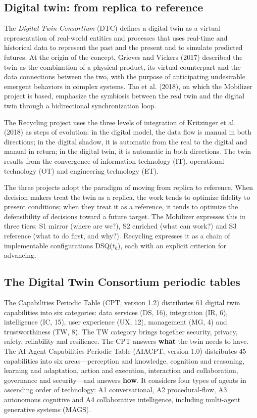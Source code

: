 \documentclass[12pt,a4paper,article,oneside,brazil,english]{abntex2}
\newcommand{\dsq}[1]{DSQ($t_{#1}$)}
\begin{document}
\subsection{Digital twin: from replica to reference}

The \textit{Digital Twin Consortium} (DTC) defines a digital twin as a virtual representation of real-world entities and processes that uses real-time and historical data to represent the past and the present and to simulate predicted futures. At the origin of the concept, Grieves and Vickers (2017) described the twin as the combination of a physical product, its virtual counterpart and the data connections between the two, with the purpose of anticipating undesirable emergent behaviors in complex systems. Tao et al. (2018), on which the Mobilizer project is based, emphasize the symbiosis between the real twin and the digital twin through a bidirectional synchronization loop.

The Recycling project uses the three levels of integration of Kritzinger et al. (2018) as steps of evolution: in the digital model, the data flow is manual in both directions; in the digital shadow, it is automatic from the real to the digital and manual in return; in the digital twin, it is automatic in both directions. The twin results from the convergence of information technology (IT), operational technology (OT) and engineering technology (ET).

The three projects adopt the paradigm of moving from replica to reference. When decision makers treat the twin as a replica, the work tends to optimize fidelity to present conditions; when they treat it as a reference, it tends to optimize the defensibility of decisions toward a future target. The Mobilizer expresses this in three tiers: S1 mirror (where are we?), S2 enriched (what can work?) and S3 reference (what to do first, and why?). Recycling expresses it as a chain of implementable configurations \dsq{k}, each with an explicit criterion for advancing.

\subsection{The Digital Twin Consortium periodic tables}

The Capabilities Periodic Table (CPT, version 1.2) distributes 61 digital twin capabilities into six categories: data services (DS, 16), integration (IR, 6), intelligence (IC, 15), user experience (UX, 12), management (MG, 4) and trustworthiness (TW, 8). The TW category brings together security, privacy, safety, reliability and resilience. The CPT answers \textbf{what} the twin needs to have. The AI Agent Capabilities Periodic Table (AIACPT, version 1.0) distributes 45 capabilities into six areas---perception and knowledge, cognition and reasoning, learning and adaptation, action and execution, interaction and collaboration, governance and security---and answers \textbf{how}. It considers four types of agents in ascending order of technology: A1 conversational, A2 procedural-flow, A3 autonomous cognitive and A4 collaborative intelligence, including multi-agent generative systems (MAGS).
\end{document}
